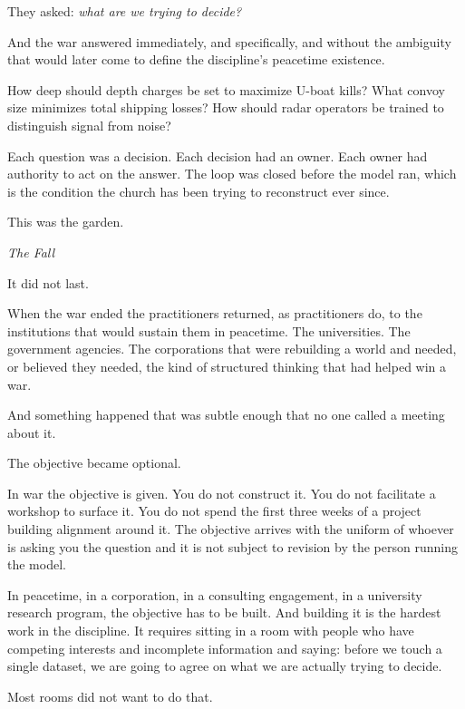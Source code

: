 They asked: \textit{what are we trying to decide?}

And the war answered immediately, and specifically, and without the ambiguity that would later come to define the discipline's peacetime existence.

How deep should depth charges be set to maximize U-boat kills? What convoy size minimizes total shipping losses? How should radar operators be trained to distinguish signal from noise?

Each question was a decision. Each decision had an owner. Each owner had authority to act on the answer. The loop was closed before the model ran, which is the condition the church has been trying to reconstruct ever since.

This was the garden.

\vspace{1.5em}
\begin{center}
  \small\itshape The Fall
\end{center}
\vspace{1.5em}

It did not last.

When the war ended the practitioners returned, as practitioners do, to the institutions that would sustain them in peacetime. The universities. The government agencies. The corporations that were rebuilding a world and needed, or believed they needed, the kind of structured thinking that had helped win a war.

And something happened that was subtle enough that no one called a meeting about it.

The objective became optional.

In war the objective is given. You do not construct it. You do not facilitate a workshop to surface it. You do not spend the first three weeks of a project building alignment around it. The objective arrives with the uniform of whoever is asking you the question and it is not subject to revision by the person running the model.

In peacetime, in a corporation, in a consulting engagement, in a university research program, the objective has to be built. And building it is the hardest work in the discipline. It requires sitting in a room with people who have competing interests and incomplete information and saying: before we touch a single dataset, we are going to agree on what we are actually trying to decide.

Most rooms did not want to do that.

